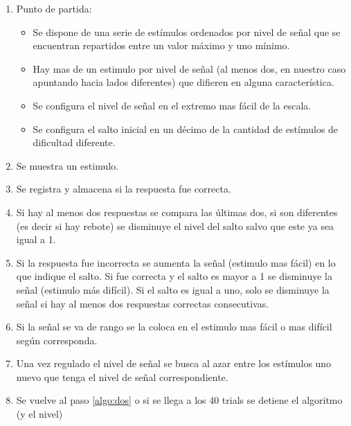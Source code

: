 \documentclass{article}
\begin{document}
    \begin{enumerate}
        \item Punto de partida:
        \begin{itemize}
            \item Se dispone de una serie de estímulos ordenados por nivel de señal que se encuentran repartidos entre un valor máximo y uno mínimo. 
            \item Hay mas de un estimulo por nivel de señal (al menos dos, en nuestro caso apuntando hacia lados diferentes) que difieren en alguna característica.
            \item Se configura el nivel de señal en el extremo mas fácil de la escala. 
            \item Se configura el salto inicial en un décimo de la cantidad de estímulos de dificultad diferente.
        \end{itemize}
        \item Se muestra un estimulo. \label{algo:dos}
        \item Se registra y almacena si la respuesta fue correcta.
        \item Si hay al menos dos respuestas se compara las últimas dos, si son diferentes (es decir si hay rebote) se disminuye el nivel del salto salvo que este ya sea igual a 1.
        \item Si la respuesta fue incorrecta se aumenta la señal (estimulo mas fácil) en lo que indique el salto. Si fue correcta y el salto es mayor a 1 se disminuye la señal (estimulo más difícil). Si el salto es igual a uno, solo se disminuye la señal si hay al menos dos respuestas correctas consecutivas.  
        \item Si la señal se va de rango se la coloca en el estimulo mas fácil o mas difícil según corresponda. 
        \item Una vez regulado el nivel de señal se busca al azar entre los estímulos uno nuevo que tenga el nivel de señal correspondiente. 
        \item Se vuelve al paso \ref{algo:dos} o si se llega a los 40 trials se detiene el algoritmo (y el nivel)
    \end{enumerate}
    
\end{document}
